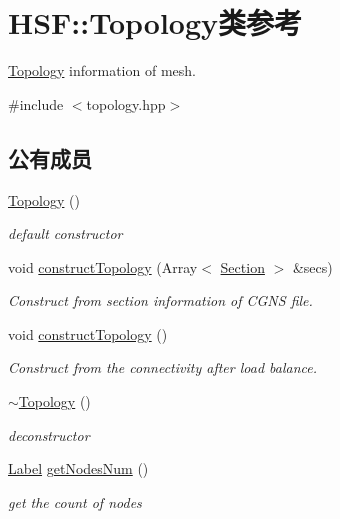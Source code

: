 \hypertarget{classHSF_1_1Topology}{
\section{HSF::Topology类参考}
\label{classHSF_1_1Topology}
}


\hyperlink{classHSF_1_1Topology}{Topology} information of mesh.  


{\ttfamily \#include $<$topology.hpp$>$}\subsection*{公有成员}
\begin{DoxyCompactItemize}
\item 
\hyperlink{classHSF_1_1Topology_a0248d01b1c87c4d1450771da9f841dee}{Topology} ()
\begin{DoxyCompactList}\small\item\em default constructor \item\end{DoxyCompactList}\item 
void \hyperlink{classHSF_1_1Topology_a95c9a7e1275aa1024ea624c3a2097f27}{constructTopology} (Array$<$ \hyperlink{classHSF_1_1Section}{Section} $>$ \&secs)
\begin{DoxyCompactList}\small\item\em Construct from section information of CGNS file. \item\end{DoxyCompactList}\item 
void \hyperlink{classHSF_1_1Topology_ab2ab89acd7b086d5b95a719f7869b896}{constructTopology} ()
\begin{DoxyCompactList}\small\item\em Construct from the connectivity after load balance. \item\end{DoxyCompactList}\item 
\hyperlink{classHSF_1_1Topology_a16f4d3d8b4a870cbd26794a1c8d3cc5c}{$\sim$Topology} ()
\begin{DoxyCompactList}\small\item\em deconstructor \item\end{DoxyCompactList}\item 
\hyperlink{namespaceHSF_ae65d72be782e989396ebe5ec6ae4c2b6}{Label} \hyperlink{classHSF_1_1Topology_a9a62513cf2963da4ab2bf58d46d6d9f7}{getNodesNum} ()
\begin{DoxyCompactList}\small\item\em get the count of nodes \item\end{DoxyCompactList}\item 

\end{DoxyCompactItemize}
